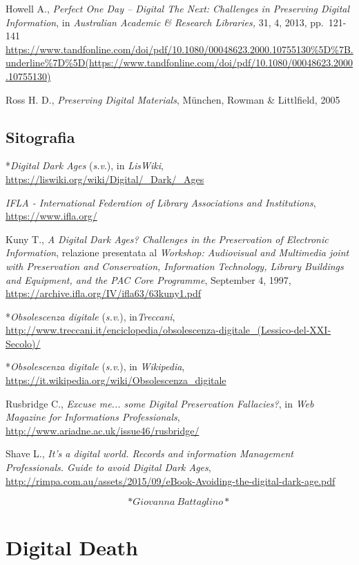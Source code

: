 \documentclass[
  b5paper,
  twoside,
  12pt,
  chapterprefix=false,
  bibliography=totocnumbered,
  parskip=false]{scrbook}
\begin{document}
Howell A., \emph{Perfect One Day -- Digital The Next: Challenges in
Preserving Digital Information}, in \emph{Australian Academic \& Research
Libraries,} 31, 4, 2013, pp.~121-141
\url{https://www.tandfonline.com/doi/pdf/10.1080/00048623.2000.10755130\%5D\%7B.underline\%7D\%5D(https://www.tandfonline.com/doi/pdf/10.1080/00048623.2000.10755130)}

Ross H. D., \emph{Preserving Digital Materials}, München, Rowman \&
Littlfield, 2005

\hypertarget{sitografia-8}{%
\section*{Sitografia}\label{sitografia-8}}

*\emph{Digital Dark Ages} (\emph{s.v}.), in \emph{LisWiki},
\url{https://liswiki.org/wiki/Digital/_Dark/_Ages}

\emph{IFLA - International Federation of Library Associations and
Institutions},
\url{https://www.ifla.org/}

Kuny T., \emph{A Digital Dark Ages? Challenges in the Preservation of
Electronic Information}, relazione presentata al \emph{Workshop: Audiovisual
and Multimedia joint with Preservation and Conservation, Information
Technology, Library Buildings and Equipment, and the PAC Core
Programme}, September 4, 1997,
\url{https://archive.ifla.org/IV/ifla63/63kuny1.pdf}

*\emph{Obsolescenza digitale} (\emph{s.v}.), in\emph{Treccani},
\url{http://www.treccani.it/enciclopedia/obsolescenza-digitale_(Lessico-del-XXI-Secolo)/}

*\emph{Obsolescenza digitale} (\emph{s.v}.), in \emph{Wikipedia},
\url{https://it.wikipedia.org/wiki/Obsolescenza_digitale}

Rusbridge C., \emph{Excuse me... some Digital Preservation Fallacies?}, in
\emph{Web Magazine for Informations Professionals},
\url{http://www.ariadne.ac.uk/issue46/rusbridge/}

Shave L., \emph{It's a digital world. Records and information Management
Professionals. Guide to avoid Digital Dark Ages},
\url{http://rimpa.com.au/assets/2015/09/eBook-Avoiding-the-digital-dark-age.pdf}

\[*Giovanna~Battaglino*\]

\hypertarget{digital-death}{%
\chapter{Digital Death}\label{digital-death}}
\end{document}

